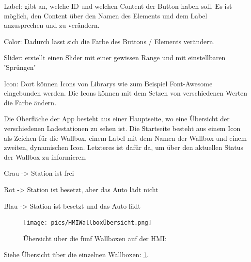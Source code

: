 \begin{compactitem}


\item Label: gibt an, welche ID und welchen Content der Button haben soll. Es ist möglich, den Content über den Namen des Elements und dem Label anzusprechen und zu verändern.
\item Color: Dadurch lässt sich die Farbe des Buttons / Elements verändern.
\item Slider: erstellt einen Slider mit einer gewissen Range und mit einstellbaren 'Sprüngen'
\item Icon: Dort können Icons von Librarys wie zum Beispiel Font-Awesome eingebunden werden. Die Icons können mit dem Setzen von verschiedenen Werten die Farbe ändern.
\end{compactitem}
Die Oberfläche der App besteht aus einer Hauptseite, wo eine Übersicht der verschiedenen Ladestationen zu sehen ist. Die Startseite besteht aus einem Icon als Zeichen für die Wallbox, einem Label mit dem Namen der Wallbox und einem zweiten, dynamischen Icon. Letzteres ist dafür da, um über den aktuellen Status der Wallbox zu informieren.


\begin{compactitem}
\item Grau -> Station ist frei
\item Rot -> Station ist besetzt, aber das Auto lädt nicht
\item Blau -> Station ist besetzt und das Auto lädt
\end{compactitem}



\begin{figure}[h t]
\centering
\texttt{[image: pics/HMIWallboxÜbersicht.png]}
\caption{Übersicht über die fünf Wallboxen auf der HMI: }
\label{fig:impl:HMIWallboxÜbersicht}
\end{figure}


Siehe Übersicht über die einzelnen Wallboxen: \ref{fig:impl:HMIWallboxÜbersicht}.




